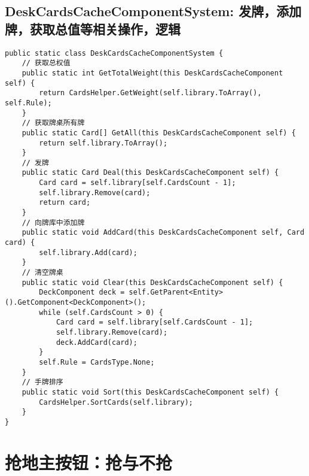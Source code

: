 \documentclass[9pt, b5paper]{article}
\begin{document}
\subsection{DeskCardsCacheComponentSystem: 发牌，添加牌，获取总值等相关操作，逻辑}
\label{sec-2-4}
\begin{verbatim}
public static class DeskCardsCacheComponentSystem {
    // 获取总权值
    public static int GetTotalWeight(this DeskCardsCacheComponent self) {
        return CardsHelper.GetWeight(self.library.ToArray(), self.Rule);
    }
    // 获取牌桌所有牌
    public static Card[] GetAll(this DeskCardsCacheComponent self) {
        return self.library.ToArray();
    }
    // 发牌
    public static Card Deal(this DeskCardsCacheComponent self) {
        Card card = self.library[self.CardsCount - 1];
        self.library.Remove(card);
        return card;
    }
    // 向牌库中添加牌
    public static void AddCard(this DeskCardsCacheComponent self, Card card) {
        self.library.Add(card);
    }
    // 清空牌桌
    public static void Clear(this DeskCardsCacheComponent self) {
        DeckComponent deck = self.GetParent<Entity>().GetComponent<DeckComponent>();
        while (self.CardsCount > 0) {
            Card card = self.library[self.CardsCount - 1];
            self.library.Remove(card);
            deck.AddCard(card);
        }
        self.Rule = CardsType.None;
    }
    // 手牌排序
    public static void Sort(this DeskCardsCacheComponent self) {
        CardsHelper.SortCards(self.library);
    }
}
\end{verbatim}

\section{抢地主按钮：抢与不抢}
\label{sec-3}
\end{document}
